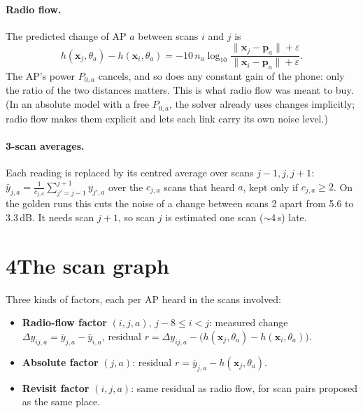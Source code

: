 \documentclass[11pt]{article}
\newcommand{\x}{\mathbf{x}}
\newcommand{\p}{\mathbf{p}}
\begin{document}
\paragraph{Radio flow.} The predicted change of AP $a$ between scans $i$ and $j$ is
\begin{equation}
h(\x_j,\theta_a)-h(\x_i,\theta_a)=-10\,n_a\log_{10}\frac{\lVert\x_j-\p_a\rVert+\varepsilon}{\lVert\x_i-\p_a\rVert+\varepsilon}.
\end{equation}
The AP's power $P_{0,a}$ cancels, and so does any constant gain of the phone: only the ratio of the two
distances matters. This is what radio flow was meant to buy. (In an absolute model with a free $P_{0,a}$,
the solver already uses changes implicitly; radio flow makes them explicit and lets each link carry its
own noise level.)

\paragraph{3-scan averages.} Each reading is replaced by its centred average over scans $j-1,j,j+1$:
$\bar y_{j,a}=\frac{1}{c_{j,a}}\sum_{j'=j-1}^{j+1}y_{j',a}$ over the $c_{j,a}$ scans that heard $a$, kept
only if $c_{j,a}\ge2$. On the golden runs this cuts the noise of a change between scans 2 apart from 5.6 to 3.3\,dB. It needs scan
$j+1$, so scan $j$ is estimated one scan ($\sim$4\,s) late.

\section*{4\quad The scan graph}
\begin{center}
\end{center}
Three kinds of factors, each per AP heard in the scans involved:
\begin{itemize}
\item \textbf{Radio-flow factor} $(i,j,a)$, $j-8\le i<j$: measured change $\Delta y_{ij,a}=\bar y_{j,a}-\bar y_{i,a}$,
residual $r=\Delta y_{ij,a}-\big(h(\x_j,\theta_a)-h(\x_i,\theta_a)\big)$.
\item \textbf{Absolute factor} $(j,a)$: residual $r=\bar y_{j,a}-h(\x_j,\theta_a)$.
\item \textbf{Revisit factor} $(i,j,a)$: same residual as radio flow, for scan pairs proposed as the same place.
\end{itemize}
\end{document}
